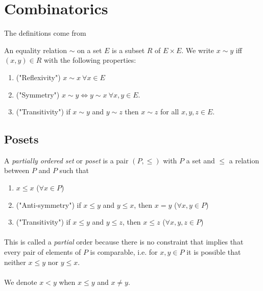 \section{Combinatorics}

The definitions come from~\cite{polytopes}

\begin{definition}
  An equality relation $\sim$ on a set $E$ is a subset $R$ of $E \times E$. We write $x \sim y$ iff $(x,y) \in R$ with the following properties:
  \begin{enumerate}
    \item ("Reflexivity") $x \sim x \ \forall x \in E$
    \item ("Symmetry") $x \sim y \Leftrightarrow y\sim x \ \forall x,y \in E$.
    \item ("Transitivity") if $x \sim y$ and $y \sim z$ then $x \sim z$ for all $x,y,z \in E$.
  \end{enumerate}
\end{definition}

\subsection{Posets}

\begin{definition}
  A \textit{partially ordered set} or \textit{poset} is a pair $(P,\le)$ with $P$ a set and $\le$ a relation between $P$ and $P$ such that
  \begin{enumerate}
    \item $x \le x$ ($\forall x \in P$)
    \item ("Anti-symmetry") if $x \le y$ and $y \le x$, then $x = y$ ($\forall x,y \in P$)
    \item ("Transitivity") if $x \le y$ and $y \le z$, then $x \le z$ ($\forall x,y,z \in P$)
  \end{enumerate}
\end{definition}

\paragraph{}
This is called a \textit{partial} order because there is no constraint that implies that every pair of elements of $P$ is comparable, i.e. for $x,y \in P$ it is possible that neither $x \le y$ nor $y \le x$.

\paragraph{}
We denote $x < y$ when $x \le y$ and $x \neq y$.

